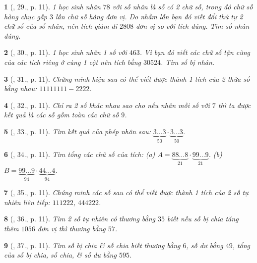 \documentclass{article}
\newtheorem{baitoan}{}
\begin{document}
\begin{baitoan}[\cite{Binh_Toan_6_tap_1}, 29., p. 11]
	1 học sinh nhân $78$ với số nhân là số có 2 chữ số, trong đó chữ số hàng chục gấp $3$ lần chữ số hàng đơn vị. Do nhầm lẫn bạn đó viết đổi thứ tự 2 chữ số của số nhân, nên tích giảm đi $2808$ đơn vị so với tích đúng. Tìm số nhân đúng.
\end{baitoan}

\begin{baitoan}[\cite{Binh_Toan_6_tap_1}, 30., p. 11]
	1 học sinh nhân 1 số với $463$. Vì bạn đó viết các chữ số tận cùng của các tích riêng ở cùng 1 cột nên tích bằng $30524$. Tìm số bị nhân.
\end{baitoan}

\begin{baitoan}[\cite{Binh_Toan_6_tap_1}, 31., p. 11]
	Chứng minh hiệu sau có thể viết được thành 1 tích của 2 thừa số bằng nhau: $11111111 - 2222$.
\end{baitoan}

\begin{baitoan}[\cite{Binh_Toan_6_tap_1}, 32., p. 11]
	Chỉ ra 2 số khác nhau sao cho nếu nhân mỗi số với $7$ thì ta được kết quả là các số gồm toàn các chữ số $9$.
\end{baitoan}

\begin{baitoan}[\cite{Binh_Toan_6_tap_1}, 33., p. 11]
	Tìm kết quả của phép nhân sau: $\underbrace{3\ldots 3}_{50}\cdot\underbrace{3\ldots 3}_{50}$.
\end{baitoan}

\begin{baitoan}[\cite{Binh_Toan_6_tap_1}, 34., p. 11]
	Tìm tổng các chữ số của tích: (a) $A = \underbrace{88\ldots8}_{21}\cdot\underbrace{99\ldots9}_{21}$. (b) $B = \underbrace{99\ldots9}_{94}\cdot\underbrace{44\ldots4}_{94}$.
\end{baitoan}

\begin{baitoan}[\cite{Binh_Toan_6_tap_1}, 35., p. 11]
	Chứng minh các số sau có thể viết được thành 1 tích của 2 số tự nhiên liên tiếp: $111222$, $444222$.
\end{baitoan}

\begin{baitoan}[\cite{Binh_Toan_6_tap_1}, 36., p. 11]
	Tìm 2 số tự nhiên có thương bằng $35$ biết nếu số bị chia tăng thêm $1056$ đơn vị thì thương bằng $57$.
\end{baitoan}

\begin{baitoan}[\cite{Binh_Toan_6_tap_1}, 37., p. 11]
	Tìm số bị chia \& số chia biết thương bằng $6$, số dư bằng $49$, tổng của số bị chia, số chia, \& số dư bằng $595$.
\end{baitoan}
\end{document}
